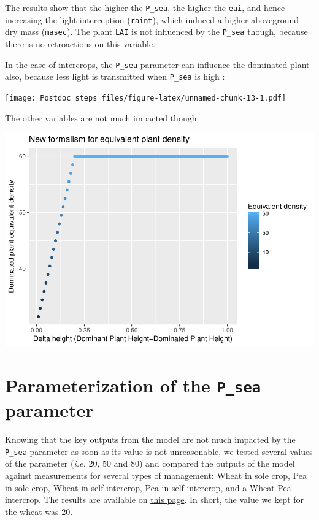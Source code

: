\documentclass[]{book}
\begin{document}
The results show that the higher the \texttt{P\_sea}, the higher the \texttt{eai}, and hence increasing the light interception (\texttt{raint}), which induced a higher aboveground dry mass (\texttt{masec}). The plant \texttt{LAI} is not influenced by the \texttt{P\_sea} though, because there is no retroactions on this variable.

In the case of intercrops, the \texttt{P\_sea} parameter can influence the dominated plant also, because less light is transmitted when \texttt{P\_sea} is high :

\texttt{[image: Postdoc\_steps\_files/figure-latex/unnamed-chunk-13-1.pdf]}

The other variables are not much impacted though:

\includegraphics{Postdoc_steps_files/figure-latex/unnamed-chunk-14-1.pdf}

\hypertarget{parameterization-of-the-p_sea-parameter}{%
\section{\texorpdfstring{Parameterization of the \texttt{P\_sea} parameter}{Parameterization of the P\_sea parameter}}\label{parameterization-of-the-p_sea-parameter}}

Knowing that the key outputs from the model are not much impacted by the \texttt{P\_sea} parameter as soon as its value is not unreasonable, we tested several values of the parameter (\emph{i.e.} 20, 50 and 80) and compared the outputs of the model against measurements for several types of management: Wheat in sole crop, Pea in sole crop, Wheat in self-intercrop, Pea in self-intercrop, and a Wheat-Pea intercrop.
The results are available on \href{Wheat_EAI.html}{this page}. In short, the value we kept for the wheat was 20.
\end{document}
